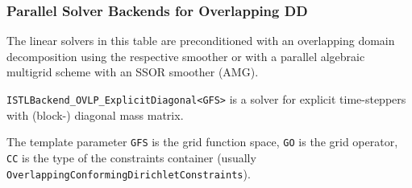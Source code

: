 \begin{frame}
  \frametitle{Parallel Solver Backends for Overlapping DD}
The linear solvers in this table are preconditioned with an overlapping domain decomposition
using the respective smoother or with a parallel algebraic multigrid scheme with an SSOR smoother (AMG).\medskip

\medskip

\lstinline!ISTLBackend_OVLP_ExplicitDiagonal<GFS>! is a solver for explicit
time-steppers with (block-) diagonal mass matrix.

The template parameter \lstinline!GFS! is the grid function space, \lstinline!GO! is the grid operator, \lstinline!CC! is the type of the
constraints container (usually \lstinline!OverlappingConformingDirichletConstraints!).
\end{frame}

